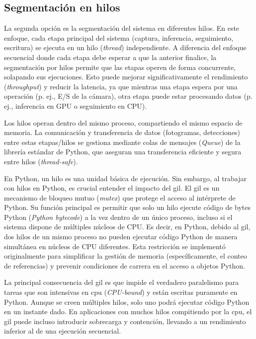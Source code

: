 \documentclass[11pt,spanish,listoffigures,listoftables]{tfgetsinf}
\begin{document}
\subsection{Segmentación en hilos} \label{sub:segmentacion_hilos}

La segunda opción es la segmentación del sistema en diferentes hilos. En este enfoque, cada etapa principal del sistema (captura, inferencia, seguimiento, escritura) se ejecuta en un hilo (\textit{thread}) independiente. A diferencia del enfoque secuencial donde cada etapa debe esperar a que la anterior finalice, la segmentación por hilos permite que las etapas operen de forma concurrente, solapando sus ejecuciones. Esto puede mejorar significativamente el rendimiento (\textit{throughput}) y reducir la latencia, ya que mientras una etapa espera por una operación (p. ej., E/S de la cámara), otra etapa puede estar procesando datos (p. ej., inferencia en GPU o seguimiento en CPU). 

Los hilos operan dentro del mismo proceso, compartiendo el mismo espacio de memoria. La comunicación y transferencia de datos (fotogramas, detecciones) entre estas etapas/hilos se gestiona mediante colas de mensajes (\textit{Queue}\cite{queue_python}) de la librería estándar de Python, que aseguran una transferencia eficiente y segura entre hilos (\textit{thread-safe}).


En Python, un hilo es una unidad básica de ejecución. Sin embargo, al trabajar con hilos en Python, es crucial entender el impacto del \gls{gil}. El \gls{gil} es un mecanismo de bloqueo mutuo (\textit{mutex}) que protege el acceso al intérprete de Python. Su función principal es permitir que solo un hilo ejecute código de bytes Python (\textit{Python bytecode}) a la vez dentro de un único proceso, incluso si el sistema dispone de múltiples núcleos de CPU. Es decir, en Python, debido al \gls{gil}, dos hilos de un mismo proceso no pueden ejecutar código Python de manera simultánea en núcleos de CPU diferentes. Esta restricción se implementó originalmente para simplificar la gestión de memoria (específicamente, el conteo de referencias) y prevenir condiciones de carrera en el acceso a objetos Python.

La principal consecuencia del \gls{gil} es que impide el verdadero paralelismo para tareas que son intensivas en \gls{cpu} (\textit{CPU-bound}) y están escritas puramente en Python. Aunque se creen múltiples hilos, solo uno podrá ejecutar código Python en un instante dado. En aplicaciones con muchos hilos compitiendo por la \gls{cpu}, el \gls{gil} puede incluso introducir sobrecarga y contención, llevando a un rendimiento inferior al de una ejecución secuencial.
\end{document}
